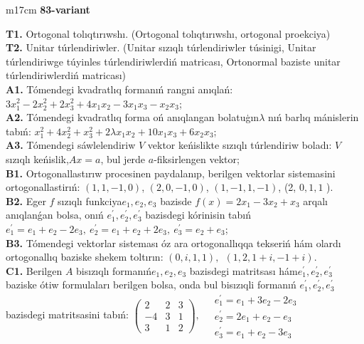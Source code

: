 \documentclass{article}
\begin{document}
\begin{tabular}{m{17cm}}
\textbf{83-variant}
\newline

\textbf{T1.} Ortogonal  tolıqtırıwshı. (Ortogonal tolıqtırıwshı,  ortogonal proekciya) \\
\textbf{T2.} Unitar túrlendiriwler. (Unitar sızıqlı túrlendiriwler túsinigi,  Unitar túrlendiriwge túyinles túrlendiriwlerdiń matricası,   Ortonormal baziste unitar túrlendiriwlerdiń matricası) \\
\textbf{A1.} Tómendegi kvadratlıq formanıń rangni anıqlań: \(3x_{1}^{2} - 2x_{2}^{2} + 2x_{3}^{2} + 4x_{1}x_{2} - 3x_{1}x_{3} - x_{2}x_{3}\); \\
\textbf{A2.} Tómendegi kvadratlıq forma oń anıqlangan bolatuģın\(\lambda\) nıń barlıq mánislerin tabıń: \(x_{1}^{2} + 4x_{2}^{2} + x_{3}^{2} + 2\lambda x_{1}x_{2} + 10x_{1}x_{3} + 6x_{2}x_{3}\); \\
\textbf{A3.} Tómendegi sáwlelendiriw \(V\) vektor keńislikte sızıqlı túrlendiriw boladı: \(V\) sızıqlı keńislik,\(Ax = a\), bul jerde \(a\)-fiksirlengen vektor; \\
\textbf{B1.} Ortogonallastırıw procesinen paydalanıp, berilgen vektorlar sistemasini ortogonallastirıń: \((1,1, - 1,0)\), \((2,0, - 1,0)\), \((1, - 1,1, - 1)\), (2, \(0,1,1\) ). \\
\textbf{B2.} Eger \(f\) sızıqlı funkciya\(e_{1},e_{2},e_{3}\) bazisde \(f(x) = 2x_{1} - 3x_{2} + x_{3}\) arqalı anıqlanǵan bolsa, onıń \(e_{1}^{'},e_{2}^{'},e_{3}^{'}\) bazisdegi kórinisin tabıń\(e_{1}^{'} = e_{1} + e_{2} - 2e_{3},\ e_{2}^{'} = e_{1} + e_{2} + 2e_{3},\ e_{3}^{'} = e_{2} + e_{3}\); \\
\textbf{B3.} Tómendegi vektorlar sisteması óz ara ortogonallıqqa tekseriń hám olardı ortogonallıq baziske shekem toltırın: \((0,i,1,1),\ \ (1,2,1 + i, - 1 + i)\). \\
\textbf{C1.} Berilgen \(A\) bisızıqlı formanıń\(e_{1},e_{2},e_{3}\) bazisdegi matritsası hám\(e_{1}^{'},e_{2}^{'},e_{3}^{'}\) baziske ótiw formulaları berilgen bolsa, onda bul bisızıqli formanıń \(e_{1}^{'},e_{2}^{'},e_{3}^{'}\) bazisdegi matritsasini tabıń: \(\begin{pmatrix} 2 & 2 & 3 \\  - 4 & 3 & 1 \\ 3 & 1 & 2 \end{pmatrix},\ \begin{matrix}  & e_{1}^{'} = e_{1} + 3e_{2} - 2e_{3} \\  & e_{2}^{'} = 2e_{1} + e_{2} - e_{3} \\  & e_{3}^{'} = e_{1} + e_{2} - 3e_{3} \end{matrix}\) \\

\end{tabular}
\end{document}
